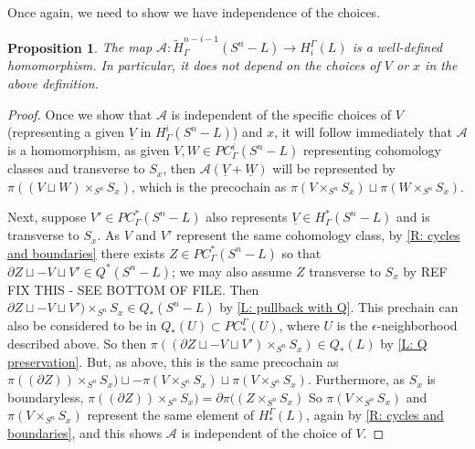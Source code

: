 \documentclass[12pt]{article}
\theoremstyle{plain}
\newtheorem{proposition}[theorem]{Proposition}
\theoremstyle{definition}
\theoremstyle{remark}
\newcommand{\uW}{\underline{W}}
\newcommand{\uV}{\underline{V}}
\newcommand{\td}[1]{\tilde{#1}}
\newcommand{\bd}{\partial}
\newcommand{\mc}[1]{\mathcal{#1}}
\begin{document}
Once again, we need to show we have independence of the choices.

\begin{proposition}
The map $\mc A \colon \td H^{n-i-1}_\Gamma(S^n-L) \to H_i^\Gamma(L)$ is a well-defined homomorphism.
In particular, it does not depend on the choices of $V$ or $x$ in the above definition.
\end{proposition}
\begin{proof}
Once we show that $\mc A$ is independent of the specific choices of $V$ (representing a given $\uV$ in $H^i_\Gamma(S^n-L)$) and $x$, it will follow immediately that $\mc A$ is a homomorphism, as given $V,W\in PC^i_\Gamma(S^n-L)$ representing cohomology classes and transverse to $S_x$, then $\mc A(\uV + \uW)$ will be represented by $\pi((V \sqcup W) \times_{S^n} S_x)$, which is the precochain as $\pi(V  \times_{S^n} S_x) \sqcup \pi(W \times_{S^n} S_x)$.

Next, suppose $V' \in PC^*_\Gamma(S^n-L)$ also represents $\uV \in H^*_\Gamma(S^n-L)$ and is transverse to $S_x$.
As $V$ and $V'$ represent the same cohomology class, by \cref{R: cycles and boundaries} there exists $Z \in PC^*_\Gamma(S^n-L)$ so that $\bd Z\sqcup -V \sqcup V' \in Q^*(S^n-L)$; we may also assume $Z$ transverse to $S_x$ by REF FIX THIS - SEE BOTTOM OF FILE.
Then $\bd Z \sqcup -V \sqcup V') \times_{S^n} S_x \in Q_*(S^n-L)$ by \cref{L: pullback with Q}.
This prechain can also be considered to be in $Q_*(U) \subset PC_*^\Gamma(U)$, where $U$ is the $\epsilon$-neighborhood described above.
So then $\pi((\bd Z \sqcup -V \sqcup V') \times_{S^n} S_x ) \in Q_*(L)$ by \cref{L: Q preservation}.
But, as above, this is the same precochain as  $\pi((\bd Z)) \times_{S^n} S_x ) \sqcup -\pi(V  \times_{S^n} S_x) \sqcup \pi(V \times_{S^n} S_x)$.
Furthermore, as $S_x$ is boundaryless, $\pi((\bd Z)) \times_{S^n} S_x) = \bd \pi((Z \times_{S^n} S_x)$
So $\pi(V  \times_{S^n} S_x)$ and $\pi(V  \times_{S^n} S_x)$ represent the same element of $H_*^\Gamma(L)$, again by \cref{R: cycles and boundaries}, and this shows $\mc A$ is independent of the choice of $V$.


\end{proof}
\end{document}
